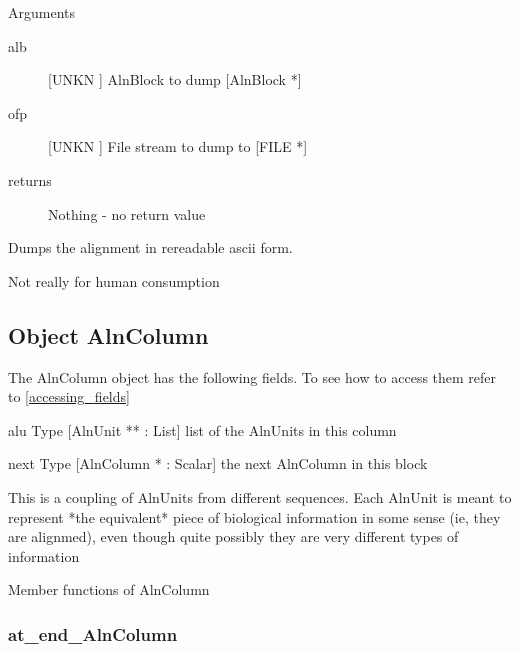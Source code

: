 Arguments
\begin{description}
\item[alb] [UNKN ] AlnBlock to dump [AlnBlock *]
\item[ofp] [UNKN ] File stream to dump to [FILE *]
\item[returns] Nothing - no return value
\end{description}
Dumps the alignment in rereadable ascii form.


Not really for human consumption


\subsection{Object AlnColumn}

\label{object_AlnColumn}

The AlnColumn object has the following fields. To see how to access them refer to \ref{accessing_fields}
\begin{description}
\item{alu} Type [AlnUnit ** : List]  list of the AlnUnits in this column

\item{next} Type [AlnColumn * : Scalar]  the next AlnColumn in this block

\end{description}
This is a coupling of AlnUnits from different sequences.
Each AlnUnit is meant to represent *the equivalent* piece
of biological information in some sense (ie, they are
alignmed), even though quite possibly they are very 
different types of information




Member functions of AlnColumn

\subsubsection{at_end_AlnColumn}

